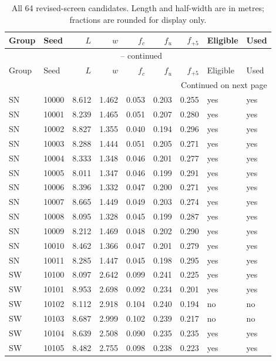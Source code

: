 \begingroup\footnotesize
\begin{longtable}{@{}llrrrrrll@{}}
\caption{All 64 revised-screen candidates. Length and half-width are in metres; fractions are rounded for display only.}\\
\toprule
Group & Seed & $L$ & $w$ & $f_c$ & $f_u$ & $f_{+5}$ & Eligible & Used\\\midrule\endfirsthead
\multicolumn{9}{c}{\tablename\ \thetable{} -- continued}\\
\toprule
Group & Seed & $L$ & $w$ & $f_c$ & $f_u$ & $f_{+5}$ & Eligible & Used\\\midrule\endhead
\midrule\multicolumn{9}{r}{Continued on next page}\\\endfoot
\bottomrule\endlastfoot
SN & 10000 & 8.612 & 1.462 & 0.053 & 0.203 & 0.255 & yes & yes\\
SN & 10001 & 8.239 & 1.465 & 0.051 & 0.207 & 0.280 & yes & yes\\
SN & 10002 & 8.827 & 1.355 & 0.040 & 0.194 & 0.296 & yes & yes\\
SN & 10003 & 8.288 & 1.444 & 0.051 & 0.205 & 0.271 & yes & yes\\
SN & 10004 & 8.333 & 1.348 & 0.046 & 0.201 & 0.277 & yes & yes\\
SN & 10005 & 8.011 & 1.347 & 0.046 & 0.199 & 0.291 & yes & yes\\
SN & 10006 & 8.396 & 1.332 & 0.047 & 0.200 & 0.271 & yes & yes\\
SN & 10007 & 8.665 & 1.449 & 0.049 & 0.203 & 0.274 & yes & yes\\
SN & 10008 & 8.095 & 1.328 & 0.045 & 0.199 & 0.287 & yes & yes\\
SN & 10009 & 8.212 & 1.469 & 0.048 & 0.202 & 0.290 & yes & yes\\
SN & 10010 & 8.462 & 1.366 & 0.047 & 0.201 & 0.279 & yes & yes\\
SN & 10011 & 8.285 & 1.447 & 0.045 & 0.198 & 0.295 & yes & yes\\
SW & 10100 & 8.097 & 2.642 & 0.099 & 0.241 & 0.225 & yes & yes\\
SW & 10101 & 8.953 & 2.698 & 0.092 & 0.234 & 0.201 & yes & yes\\
SW & 10102 & 8.112 & 2.918 & 0.104 & 0.240 & 0.194 & no & no\\
SW & 10103 & 8.687 & 2.999 & 0.102 & 0.239 & 0.217 & no & no\\
SW & 10104 & 8.639 & 2.508 & 0.090 & 0.235 & 0.235 & yes & yes\\
SW & 10105 & 8.482 & 2.755 & 0.098 & 0.238 & 0.223 & yes & yes\\

\end{longtable}
